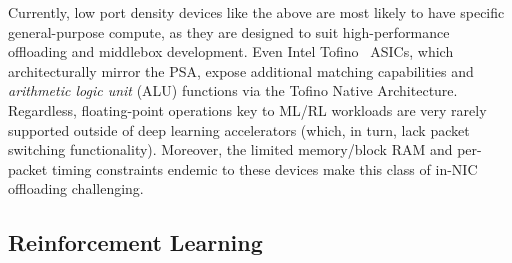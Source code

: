 \documentclass[sigconf,natbib=false]{acmart}
\newcounter{insightc}
\newenvironment{insight}
	{
		\begin{tipblock}\refstepcounter{insightc}\textbf{Insight \theinsightc:}\em
	}
	{
		\end{tipblock}
	}
\begin{document}
Currently, low port density devices like the above are most likely to have specific general-purpose compute, as they are designed to suit high-performance offloading and middlebox development.
Even Intel Tofino~\parencite{barefoot-intel} ASICs, which architecturally mirror the PSA, expose additional matching capabilities and \emph{arithmetic logic unit} (ALU) functions via the Tofino Native Architecture.
Regardless, floating-point operations key to ML/RL workloads are very rarely supported outside of deep learning accelerators (which, in turn, lack packet switching functionality).
Moreover, the limited memory/block RAM and per-packet timing constraints endemic to these devices make this class of in-NIC offloading challenging.


\subsection{Reinforcement Learning}
%
\end{document}
